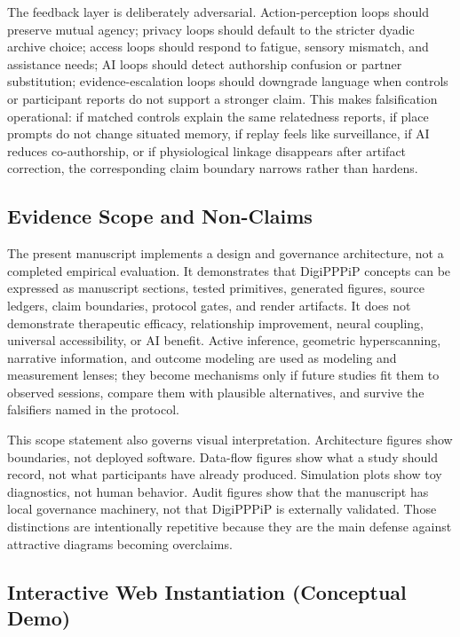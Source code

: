 \documentclass[
  english,
]{article}
\begin{document}
The feedback layer is deliberately adversarial. Action-perception loops
should preserve mutual agency; privacy loops should default to the
stricter dyadic archive choice; access loops should respond to fatigue,
sensory mismatch, and assistance needs; AI loops should detect
authorship confusion or partner substitution; evidence-escalation loops
should downgrade language when controls or participant reports do not
support a stronger claim. This makes falsification operational: if
matched controls explain the same relatedness reports, if place prompts
do not change situated memory, if replay feels like surveillance, if AI
reduces co-authorship, or if physiological linkage disappears after
artifact correction, the corresponding claim boundary narrows rather
than hardens.

\subsection{Evidence Scope and
Non-Claims}\label{evidence-scope-and-non-claims}

The present manuscript implements a design and governance architecture,
not a completed empirical evaluation. It demonstrates that DigiPPPiP
concepts can be expressed as manuscript sections, tested primitives,
generated figures, source ledgers, claim boundaries, protocol gates, and
render artifacts. It does not demonstrate therapeutic efficacy,
relationship improvement, neural coupling, universal accessibility, or
AI benefit. Active inference, geometric hyperscanning, narrative
information, and outcome modeling are used as modeling and measurement
lenses; they become mechanisms only if future studies fit them to
observed sessions, compare them with plausible alternatives, and survive
the falsifiers named in the protocol.

This scope statement also governs visual interpretation. Architecture
figures show boundaries, not deployed software. Data-flow figures show
what a study should record, not what participants have already produced.
Simulation plots show toy diagnostics, not human behavior. Audit figures
show that the manuscript has local governance machinery, not that
DigiPPPiP is externally validated. Those distinctions are intentionally
repetitive because they are the main defense against attractive diagrams
becoming overclaims.

\subsection{Interactive Web Instantiation (Conceptual
Demo)}\label{interactive-web-instantiation-conceptual-demo}
\end{document}
